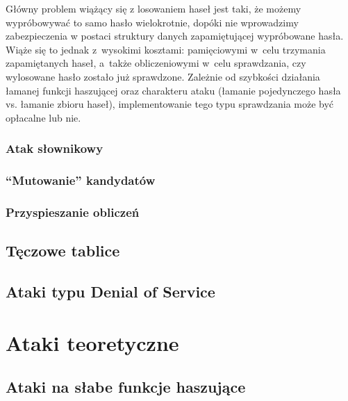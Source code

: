 \documentclass[12pt,a4paper,twoside]{article}
\begin{document}
\begin{myenumerate}

    Główny problem wiążący się z losowaniem haseł jest taki, że możemy
    wypróbowywać to samo hasło wielokrotnie, dopóki nie wprowadzimy
    zabezpieczenia w postaci struktury danych zapamiętującej wypróbowane hasła.
    Wiąże się to jednak z~wysokimi kosztami: pamięciowymi w~celu trzymania
    zapamiętanych haseł, a~także obliczeniowymi w~celu sprawdzania, czy
    wylosowane hasło zostało już sprawdzone. Zależnie od szybkości działania
    łamanej funkcji haszującej oraz charakteru ataku (łamanie pojedynczego
    hasła vs. łamanie zbioru haseł), implementowanie tego typu sprawdzania może
    być opłacalne lub nie.

\end{myenumerate}



\subsubsection{Atak słownikowy}
\label{sec:dictionary_attacks}

\subsubsection{``Mutowanie'' kandydatów}

\subsubsection{Przyspieszanie obliczeń}

\pagebreak
\subsection{Tęczowe tablice}

\subsection{Ataki typu Denial of Service}

\section{Ataki teoretyczne}

\subsection{Ataki na słabe funkcje haszujące}
\end{document}

